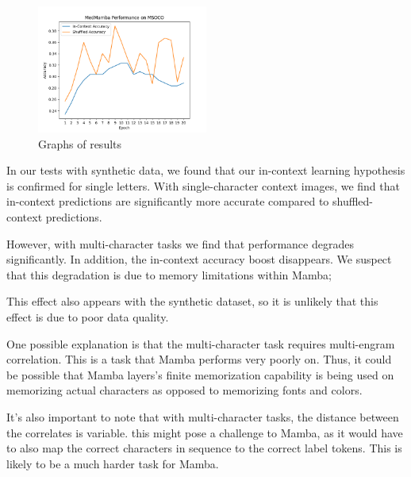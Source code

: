 \begin{figure}[!ht]
    \includegraphics[width=0.5\textwidth]{figures/medmamba_mscoco.png}
    \caption{Graphs of results}
    \label{resultslide}
\end{figure}
In our tests with synthetic data, we found that our in-context learning
hypothesis is confirmed for single letters. With single-character context
images, we find that in-context predictions are significantly more accurate
compared to shuffled-context predictions.

However, with multi-character tasks we find that performance degrades
significantly. In addition, the in-context accuracy boost disappears.
We suspect that this degradation is due to memory limitations within Mamba;

This effect also appears with the synthetic dataset, so it is unlikely that this
effect is due to poor data quality.

One possible explanation is that the multi-character task requires multi-engram
correlation.
This is a task that Mamba performs very poorly on\cite{mambangram}.
Thus, it could be possible that Mamba layers's finite memorization capability
is being used on memorizing actual characters as opposed to memorizing fonts
and colors.

It's also important to note that with multi-character tasks, the distance
between the correlates is variable.
this might pose a challenge to Mamba, as it would have to also map the correct
characters in sequence to the correct label tokens.
This is likely to be a much harder task for Mamba.

